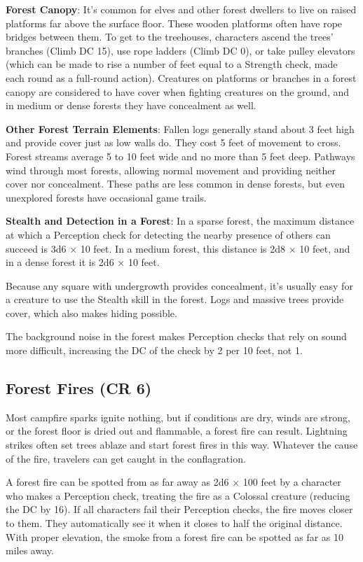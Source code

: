 \textbf{Forest Canopy}: It's common for elves and other forest dwellers to live on raised platforms far above the surface floor. These wooden platforms often have rope bridges between them. To get to the treehouses, characters ascend the trees' branches (Climb DC 15), use rope ladders (Climb DC 0), or take pulley elevators (which can be made to rise a number of feet equal to a Strength check, made each round as a full-round action). Creatures on platforms or branches in a forest canopy are considered to have cover when fighting creatures on the ground, and in medium or dense forests they have concealment as well.
				
\textbf{Other Forest Terrain Elements}: Fallen logs generally stand about 3 feet high and provide cover just as low walls do. They cost 5 feet of movement to cross. Forest streams average 5 to 10 feet wide and no more than 5 feet deep. Pathways wind through most forests, allowing normal movement and providing neither cover nor concealment. These paths are less common in dense forests, but even unexplored forests have occasional game trails.
				
\textbf{Stealth and Detection in a Forest}: In a sparse forest, the maximum distance at which a Perception check for detecting the nearby presence of others can succeed is 3d6 \mbox{$\times$} 10 feet. In a medium forest, this distance is 2d8 \mbox{$\times$} 10 feet, and in a dense forest it is 2d6 \mbox{$\times$} 10 feet.
				
Because any square with undergrowth provides concealment, it's usually easy for a creature to use the Stealth skill in the forest. Logs and massive trees provide cover, which also makes hiding possible.
				
The background noise in the forest makes Perception checks that rely on sound more difficult, increasing the DC of the check by 2 per 10 feet, not 1. 
				
\subsection{Forest Fires (CR 6)}

				
Most campfire sparks ignite nothing, but if conditions are dry, winds are strong, or the forest floor is dried out and flammable, a forest fire can result. Lightning strikes often set trees ablaze and start forest fires in this way. Whatever the cause of the fire, travelers can get caught in the conflagration.
				
A forest fire can be spotted from as far away as 2d6 \mbox{$\times$} 100 feet by a character who makes a Perception check, treating the fire as a Colossal creature (reducing the DC by 16). If all characters fail their Perception checks, the fire moves closer to them. They automatically see it when it closes to half the original distance. With proper elevation, the smoke from a forest fire can be spotted as far as 10 miles away.
				
